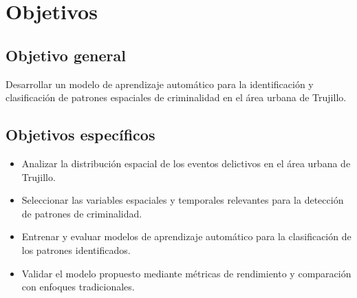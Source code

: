 
\section{Objetivos}

\label{sec:objetivos}


\subsection{Objetivo general}

Desarrollar un modelo de aprendizaje automático para la identificación
y clasificación de patrones espaciales de criminalidad en el área
urbana de Trujillo.

\subsection{Objetivos específicos}
\begin{itemize}
\item Analizar la distribución espacial de los eventos delictivos en el
área urbana de Trujillo. 
\item Seleccionar las variables espaciales y temporales relevantes para
la detección de patrones de criminalidad. 
\item Entrenar y evaluar modelos de aprendizaje automático para la clasificación
de los patrones identificados. 
\item Validar el modelo propuesto mediante métricas de rendimiento y comparación
con enfoques tradicionales. 
\end{itemize}

